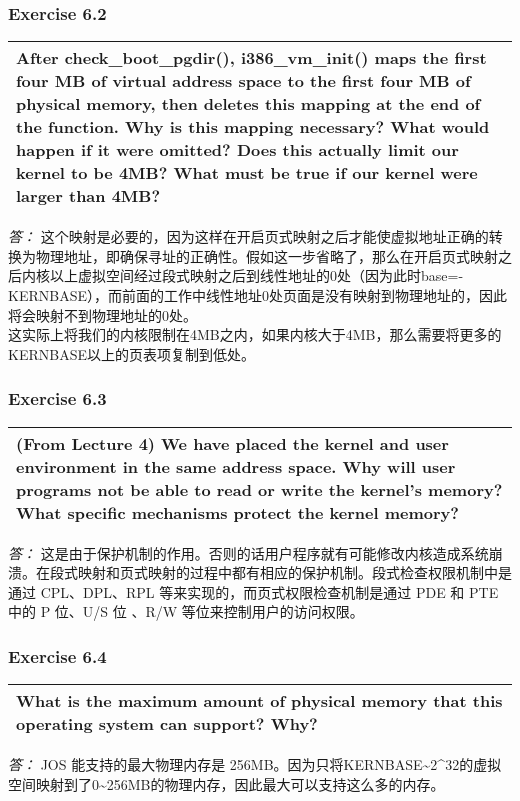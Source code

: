 \documentclass[11pt,a4paper]{article}
\begin{document}
\subsubsection{Exercise 6.2}
\begin{tabular}{|p{\textwidth}|}
\hline
After check\_boot\_pgdir(), i386\_vm\_init() maps the first four MB of virtual address space to the first four MB of physical memory, then deletes this mapping at the end of the function. Why is this mapping necessary? What would happen if it were omitted? Does this actually limit our kernel to be 4MB? What must be true if our kernel were larger than 4MB?\\
\hline
\end{tabular}
\textit{\large{答：}}
这个映射是必要的，因为这样在开启页式映射之后才能使虚拟地址正确的转换为物理地址，即确保寻址的正确性。假如这一步省略了，那么在开启页式映射之后内核以上虚拟空间经过段式映射之后到线性地址的0处（因为此时base=-KERNBASE），而前面的工作中线性地址0处页面是没有映射到物理地址的，因此将会映射不到物理地址的0处。\\
这实际上将我们的内核限制在4MB之内，如果内核大于4MB，那么需要将更多的KERNBASE以上的页表项复制到低处。\\

\subsubsection{Exercise 6.3}
\begin{tabular}{|p{\textwidth}|}
\hline
(From Lecture 4) We have placed the kernel and user environment in the same address space. Why will user programs not be able to read or write the kernel's memory? What specific mechanisms protect the kernel memory? \\
\hline
\end{tabular}
\textit{\large{答：}}
这是由于保护机制的作用。否则的话用户程序就有可能修改内核造成系统崩溃。在段式映射和页式映射的过程中都有相应的保护机制。段式检查权限机制中是通过 CPL、DPL、RPL 等来实现的，而页式权限检查机制是通过 PDE 和 PTE 中的 P 位、U/S 位 、R/W 等位来控制用户的访问权限。\\

\subsubsection{Exercise 6.4}
\begin{tabular}{|p{\textwidth}|}
\hline
What is the maximum amount of physical memory that this operating system can support? Why? \\
\hline
\end{tabular}
\textit{\large{答：}}
JOS 能支持的最大物理内存是 256MB。因为只将KERNBASE\~{}2\^{}32的虚拟空间映射到了0\~{}256MB的物理内存，因此最大可以支持这么多的内存。\\
\end{document}
